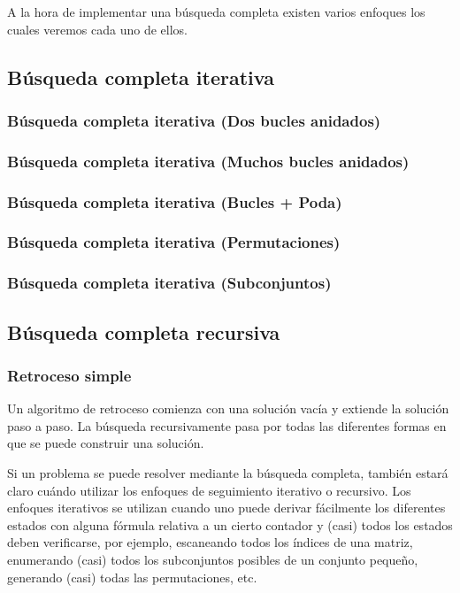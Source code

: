 A la hora de implementar una búsqueda completa existen varios enfoques los cuales veremos cada uno de ellos.

\subsection{Búsqueda completa iterativa}

\subsubsection{Búsqueda completa iterativa (Dos bucles anidados)}



\subsubsection{Búsqueda completa iterativa (Muchos bucles anidados)}

\subsubsection{Búsqueda completa iterativa (Bucles + Poda)}

\subsubsection{Búsqueda completa iterativa (Permutaciones)}

\subsubsection{Búsqueda completa iterativa  (Subconjuntos)}

\subsection{Búsqueda completa recursiva}

\subsubsection{Retroceso simple}
Un algoritmo de retroceso comienza con una solución vacía y extiende la solución paso a paso. La búsqueda recursivamente pasa por todas las diferentes formas en que se puede construir una solución. 

Si un problema se puede resolver mediante la búsqueda completa, también estará claro cuándo utilizar los enfoques de seguimiento iterativo o recursivo. Los enfoques iterativos se utilizan cuando uno puede derivar fácilmente los diferentes estados con alguna fórmula relativa a un cierto contador y (casi) todos los estados deben verificarse, por ejemplo, escaneando todos los índices de una matriz, enumerando (casi) todos los subconjuntos posibles de un conjunto pequeño, generando (casi) todas las permutaciones, etc. 

